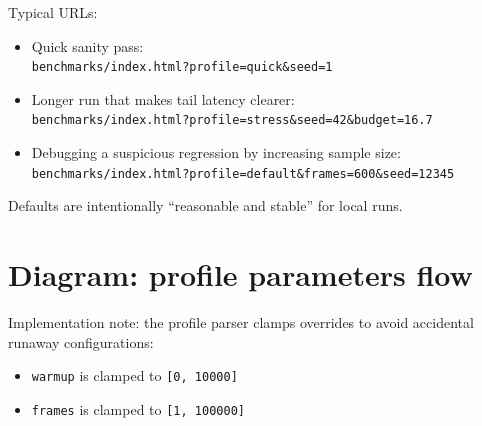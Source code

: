 Typical URLs:

\begin{itemize}
\item Quick sanity pass:\\
	\texttt{benchmarks/index.html?profile=quick\&seed=1}
\item Longer run that makes tail latency clearer:\\
	\texttt{benchmarks/index.html?profile=stress\&seed=42\&budget=16.7}
\item Debugging a suspicious regression by increasing sample size:\\
	\texttt{benchmarks/index.html?profile=default\&frames=600\&seed=12345}
\end{itemize}

Defaults are intentionally ``reasonable and stable'' for local runs.

\section*{Diagram: profile parameters flow}
\begin{center}
\end{center}

Implementation note: the profile parser clamps overrides to avoid accidental runaway configurations:

\begin{itemize}
\item \texttt{warmup} is clamped to \texttt{[0, 10000]}
\item \texttt{frames} is clamped to \texttt{[1, 100000]}
\end{itemize}

